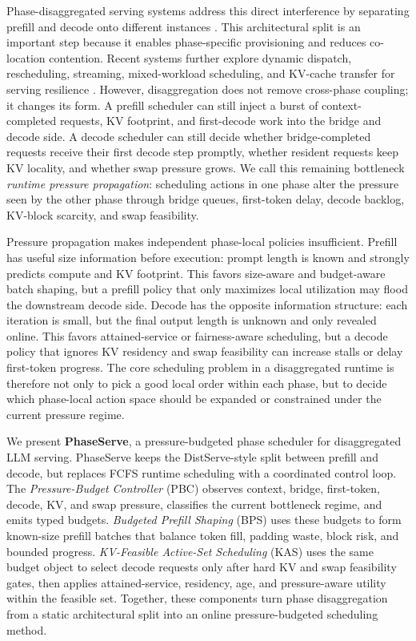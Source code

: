 \documentclass[lettersize,journal]{IEEEtran}
\begin{document}
Phase-disaggregated serving systems address this direct interference by separating prefill and decode onto different instances \cite{b5,distserve,windserve,shuffleinfer}. This architectural split is an important step because it enables phase-specific provisioning and reduces co-location contention. Recent systems further explore dynamic dispatch, rescheduling, streaming, mixed-workload scheduling, and KV-cache transfer for serving resilience \cite{b6}. However, disaggregation does not remove cross-phase coupling; it changes its form. A prefill scheduler can still inject a burst of context-completed requests, KV footprint, and first-decode work into the bridge and decode side. A decode scheduler can still decide whether bridge-completed requests receive their first decode step promptly, whether resident requests keep KV locality, and whether swap pressure grows. We call this remaining bottleneck \emph{runtime pressure propagation}: scheduling actions in one phase alter the pressure seen by the other phase through bridge queues, first-token delay, decode backlog, KV-block scarcity, and swap feasibility.

Pressure propagation makes independent phase-local policies insufficient. Prefill has useful size information before execution: prompt length is known and strongly predicts compute and KV footprint. This favors size-aware and budget-aware batch shaping, but a prefill policy that only maximizes local utilization may flood the downstream decode side. Decode has the opposite information structure: each iteration is small, but the final output length is unknown and only revealed online. This favors attained-service or fairness-aware scheduling, but a decode policy that ignores KV residency and swap feasibility can increase stalls or delay first-token progress. The core scheduling problem in a disaggregated runtime is therefore not only to pick a good local order within each phase, but to decide which phase-local action space should be expanded or constrained under the current pressure regime.

We present \textbf{PhaseServe}, a pressure-budgeted phase scheduler for disaggregated LLM serving. PhaseServe keeps the DistServe-style split between prefill and decode, but replaces FCFS runtime scheduling with a coordinated control loop. The \emph{Pressure-Budget Controller} (PBC) observes context, bridge, first-token, decode, KV, and swap pressure, classifies the current bottleneck regime, and emits typed budgets. \emph{Budgeted Prefill Shaping} (BPS) uses these budgets to form known-size prefill batches that balance token fill, padding waste, block risk, and bounded progress. \emph{KV-Feasible Active-Set Scheduling} (KAS) uses the same budget object to select decode requests only after hard KV and swap feasibility gates, then applies attained-service, residency, age, and pressure-aware utility within the feasible set. Together, these components turn phase disaggregation from a static architectural split into an online pressure-budgeted scheduling method.
\end{document}
